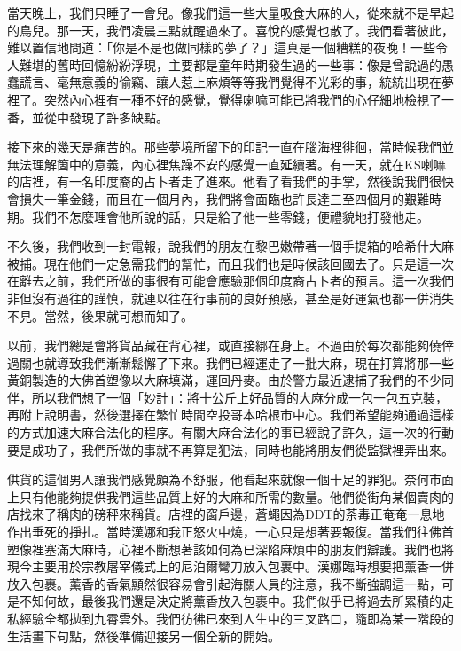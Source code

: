 當天晚上，我們只睡了一會兒。像我們這一些大量吸食大麻的人，從來就不是早起的鳥兒。那一天，我們凌晨三點就醒過來了。喜悅的感覺也散了。我們看著彼此，難以置信地問道：「你是不是也做同樣的夢了？」這真是一個糟糕的夜晚！一些令人難堪的舊時回憶紛紛浮現，主要都是童年時期發生過的一些事：像是曾說過的愚蠢謊言、毫無意義的偷竊、讓人惹上麻煩等等我們覺得不光彩的事，統統出現在夢裡了。突然內心裡有一種不好的感覺，覺得喇嘛可能已將我們的心仔細地檢視了一番，並從中發現了許多缺點。

接下來的幾天是痛苦的。那些夢境所留下的印記一直在腦海裡徘徊，當時候我們並無法理解箇中的意義，內心裡焦躁不安的感覺一直延續著。有一天，就在KS喇嘛的店裡，有一名印度裔的占卜者走了進來。他看了看我們的手掌，然後說我們很快會損失一筆金錢，而且在一個月內，我們將會面臨也許長達三至四個月的艱難時期。我們不怎麼理會他所說的話，只是給了他一些零錢，便禮貌地打發他走。

不久後，我們收到一封電報，說我們的朋友在黎巴嫩帶著一個手提箱的哈希什大麻被捕。現在他們一定急需我們的幫忙，而且我們也是時候該回國去了。只是這一次在離去之前，我們所做的事很有可能會應驗那個印度裔占卜者的預言。這一次我們非但沒有過往的謹慎，就連以往在行事前的良好預感，甚至是好運氣也都一併消失不見。當然，後果就可想而知了。

以前，我們總是會將貨品藏在背心裡，或直接綁在身上。不過由於每次都能夠僥倖過關也就導致我們漸漸鬆懈了下來。我們已經運走了一批大麻，現在打算將那一些黃銅製造的大佛首塑像以大麻填滿，運回丹麥。由於警方最近逮捕了我們的不少同伴，所以我們想了一個「妙計」：將十公斤上好品質的大麻分成一包一包五克裝，再附上說明書，然後選擇在繁忙時間空投哥本哈根市中心。我們希望能夠通過這樣的方式加速大麻合法化的程序。有關大麻合法化的事已經說了許久，這一次的行動要是成功了，我們所做的事就不再算是犯法，同時也能將朋友們從監獄裡弄出來。

供貨的這個男人讓我們感覺頗為不舒服，他看起來就像一個十足的罪犯。奈何市面上只有他能夠提供我們這些品質上好的大麻和所需的數量。他們從街角某個賣肉的店找來了稱肉的磅秤來稱貨。店裡的窗戶邊，蒼蠅因為DDT的荼毒正奄奄一息地作出垂死的掙扎。當時漢娜和我正怒火中燒，一心只是想著要報復。當我們往佛首塑像裡塞滿大麻時，心裡不斷想著該如何為已深陷麻煩中的朋友們辯護。我們也將現今主要用於宗教屠宰儀式上的尼泊爾彎刀放入包裹中。漢娜臨時想要把薰香一併放入包裹。薰香的香氣顯然很容易會引起海關人員的注意，我不斷強調這一點，可是不知何故，最後我們還是決定將薰香放入包裹中。我們似乎已將過去所累積的走私經驗全都拋到九霄雲外。我們彷彿已來到人生中的三叉路口，隨即為某一階段的生活畫下句點，然後準備迎接另一個全新的開始。

